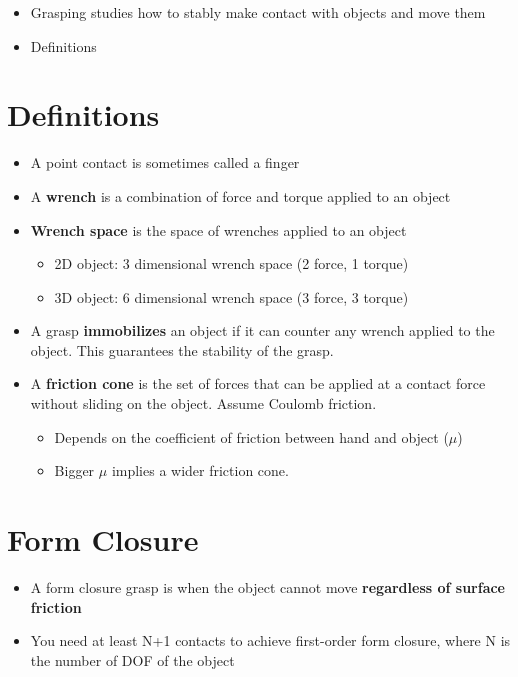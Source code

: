 \documentclass[../main.tex]{subfiles}
\begin{document}
    \begin{itemize}
        \item Grasping studies how to stably make contact with objects and move them
        \item Definitions
    \end{itemize}

    \section{Definitions}
    \begin{itemize}
        \item A point contact is sometimes called a finger
        \item A \textbf{wrench} is a combination of force and torque applied to an object
        \item \textbf{Wrench space} is the space of wrenches applied to an object
        \begin{itemize}
            \item 2D object: 3 dimensional wrench space (2 force, 1 torque)
            \item 3D object: 6 dimensional wrench space (3 force, 3 torque)
        \end{itemize}
        \item A grasp \textbf{immobilizes} an object if it can counter any wrench applied to the object. This guarantees the stability of the grasp.
        \item A \textbf{friction cone} is the set of forces that can be applied at a contact force without sliding on the object. Assume Coulomb friction.
        \begin{itemize}
            \item Depends on the coefficient of friction between hand and object ($\mu$)
            \item Bigger $\mu$ implies a wider friction cone.
        \end{itemize}
    \end{itemize}
    \section{Form Closure}
    \begin{itemize}
        \item A form closure grasp is when the object cannot move \textbf{regardless of surface friction}
        \item You need at least N+1 contacts to achieve first-order form closure, where N is the number of DOF of the object
    \end{itemize}
\end{document}
